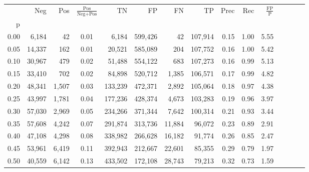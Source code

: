 \begin{tabular}{rrrcrrrrrrrrrrr}
\toprule
{} &     Neg &    Pos & $\frac{\text{Pos}}{\text{Neg}+\text{Pos}}$ &       TN &       FP &       FN &       TP &  Prec &   Rec & $\frac{\text{FP}}{\text{P}}$ \\
p    &         &        &                                            &          &          &          &          &       &       &                              \\
\midrule
0.00 &   6,184 &     42 &                                       0.01 &    6,184 &  599,426 &       42 &  107,914 &  0.15 &  1.00 &                         5.55 \\
0.05 &  14,337 &    162 &                                       0.01 &   20,521 &  585,089 &      204 &  107,752 &  0.16 &  1.00 &                         5.42 \\
0.10 &  30,967 &    479 &                                       0.02 &   51,488 &  554,122 &      683 &  107,273 &  0.16 &  0.99 &                         5.13 \\
0.15 &  33,410 &    702 &                                       0.02 &   84,898 &  520,712 &    1,385 &  106,571 &  0.17 &  0.99 &                         4.82 \\
0.20 &  48,341 &  1,507 &                                       0.03 &  133,239 &  472,371 &    2,892 &  105,064 &  0.18 &  0.97 &                         4.38 \\
0.25 &  43,997 &  1,781 &                                       0.04 &  177,236 &  428,374 &    4,673 &  103,283 &  0.19 &  0.96 &                         3.97 \\
0.30 &  57,030 &  2,969 &                                       0.05 &  234,266 &  371,344 &    7,642 &  100,314 &  0.21 &  0.93 &                         3.44 \\
0.35 &  57,608 &  4,242 &                                       0.07 &  291,874 &  313,736 &   11,884 &   96,072 &  0.23 &  0.89 &                         2.91 \\
0.40 &  47,108 &  4,298 &                                       0.08 &  338,982 &  266,628 &   16,182 &   91,774 &  0.26 &  0.85 &                         2.47 \\
0.45 &  53,961 &  6,419 &                                       0.11 &  392,943 &  212,667 &   22,601 &   85,355 &  0.29 &  0.79 &                         1.97 \\
0.50 &  40,559 &  6,142 &                                       0.13 &  433,502 &  172,108 &   28,743 &   79,213 &  0.32 &  0.73 &                         1.59 \\

\end{tabular}
